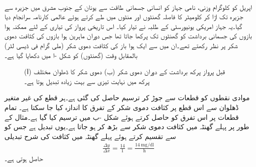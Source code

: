 \\
 اپریل  کو  کلوگرام وزنی،   نامی جہاز کو انسانی جسمانی طاقت سے   یونان کے جنوب مشرق میں جزیرہ  سے جزیرہ  تک اڑا کر  کلومیٹر  کا فاصلہ  گھنٹوں اور  منٹوں میں طے کرتے ہوئے عالمی کارنامہ سرانجام دیا گیا۔یہ جہاز امریکی یونیورسٹی کے طلبہ نے تیار کیا۔ اس تاریخی پرواز کی تیاری کے لئے ممکنہ ہوا بازوں کی جسمانی برداشت کو  گھنٹوں تک پرکھا جاتا تھا جس دوران ماہرین ہوا بازوں  کی کثافت دموی شکر پر نظر رکھتے تھے۔ان میں سے ایک ہوا باز کی کثافت دموی شکر (ملی گرام فی ڈیسی لٹر) بالمقابل وقت (گھنٹوں) کو شکل -ا میں دکھایا گیا ہے۔
\begin{figure}
\centering
\begin{subfigure}{0.5\textwidth}
\centering
{}
\caption{}
\end{subfigure}%
\begin{subfigure}{0.5\textwidth}
\centering
{}
\caption{}
\end{subfigure}%
\caption{(ا) قبل پرواز پرکھ برداشت کے دوران دموی شکر (ب) دموی شکر کا ڈھلوان مختلف پرکھ میں نہایت تیزی سے بہت زیادہ تبدیل ہوتا ہے۔}
\label{شکل_مثال_تفرق_پرواز}
\end{figure}
موادی نقطوں کو قطعات سے جوڑ کر ترسیم حاصل کی گئی ہے۔ہر قطع کی غیر متغیر ڈھلوان سے اس قطع پر کثافت دموی شکر کے تفرق کا اندازہ کیا جا سکتا ہے۔ تمام قطعات پر اس تفرق کو حاصل کرتے ہوئے شکل -ب میں ترسیم کیا گیا ہے۔مثال کے طور پر پہلے گھنٹہ میں کثافت دموی شکر  سے بڑھ کر  ہو جاتا ہے۔یوں  تبدیل  ہے جس کو  سے تقسیم کرتے ہوئے پہلے گھنٹہ میں کثافت کی شرح تبدیلی  
\begin{align*}
\frac{\Delta y}{\Delta x}=\frac{14}{1}=\frac{\SI{14}{\milli\gram\per\deci\litre}}{\si{\hour}}
\end{align*}    
حاصل ہوتی ہے۔

